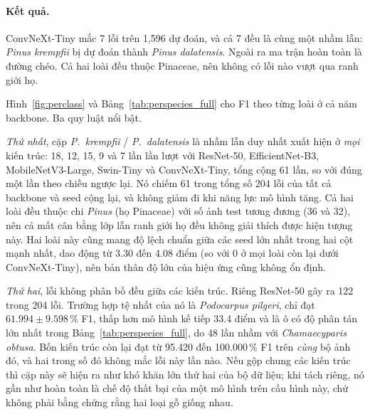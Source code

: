 \paragraph{Kết quả.} ConvNeXt-Tiny mắc 7 lỗi trên 1{,}596 dự đoán, và cả 7 đều
là cùng một nhầm lẫn: \textit{Pinus krempfii} bị dự đoán thành
\textit{Pinus dalatensis}. Ngoài ra ma trận hoàn toàn là đường chéo. Cả hai
loài đều thuộc Pinaceae, nên không có lỗi nào vượt qua ranh giới họ.



Hình~\ref{fig:perclass} và Bảng~\ref{tab:perspecies_full} cho F1 theo từng loài
ở cả năm backbone. Ba quy luật nổi bật.




\textit{Thứ nhất}, cặp \textit{P.\ krempfii} / \textit{P.\ dalatensis} là
nhầm lẫn duy nhất xuất hiện ở \emph{mọi} kiến trúc: 18, 12, 15, 9 và 7 lần lần
lượt với ResNet-50, EfficientNet-B3, MobileNetV3-Large, Swin-Tiny và
ConvNeXt-Tiny, tổng cộng 61 lần, so với đúng một lần theo chiều ngược lại. Nó
chiếm 61 trong tổng số 204 lỗi của tất cả backbone và seed cộng lại, và không
giảm đi khi năng lực mô hình tăng. Cả hai loài đều thuộc chi \textit{Pinus}
(họ Pinaceae) với số ảnh test tương đương (36 và 32), nên cả mất cân bằng lớp
lẫn ranh giới họ đều không giải thích được hiện tượng này. Hai loài này cũng
mang độ lệch chuẩn giữa các seed lớn nhất trong hai cột mạnh nhất, dao động từ 3.30
đến 4.08 điểm (so với 0 ở mọi loài còn lại dưới ConvNeXt-Tiny), nên bản thân
độ lớn của hiệu ứng cũng không ổn định.

\textit{Thứ hai}, lỗi không phân bố đều giữa các kiến trúc. Riêng ResNet-50 gây
ra 122 trong 204 lỗi. Trường hợp tệ nhất của nó là \textit{Podocarpus
pilgeri}, chỉ đạt $61.994 \pm 9.598$\,\% F1, thấp hơn mô hình kế tiếp 33.4
điểm và là ô có độ phân tán lớn nhất trong Bảng~\ref{tab:perspecies_full},
do 48 lần nhầm với \textit{Chamaecyparis obtusa}. Bốn kiến trúc còn lại đạt từ
95.420 đến 100.000\,\% F1 trên \emph{cùng} bộ ảnh đó, và hai trong số đó không
mắc lỗi này lần nào. Nếu gộp chung các kiến trúc thì cặp này sẽ hiện ra như
khó khăn lớn thứ hai của bộ dữ liệu; khi tách riêng, nó gần như hoàn toàn là
chế độ thất bại của một mô hình trên cấu hình này, chứ không phải bằng chứng
rằng hai loại gỗ giống nhau.

